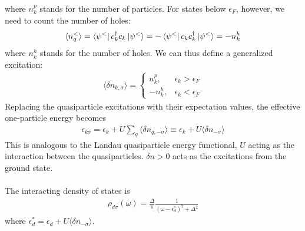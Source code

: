 where \(n^p_k\) stands for the number of particles.
For states below \(\epsilon_F\), however, we need to count the number of holes:
\begin{equation}\begin{aligned}
	\langle  n_q^<\rangle = \bra{\psi^<}c^\dagger_k c_k\ket{\psi^<} = -\bra{\psi^<}c_k c^\dagger_k \ket{\psi^<} = -n^h_k
\end{aligned}\end{equation}
where \(n^h_k\) stands for the number of holes.
We can thus define a generalized excitation:
\begin{equation}\begin{aligned}
	\langle \delta n_{k,\sigma}\rangle = \begin{cases} n^p_k, &\epsilon_k > \epsilon_F\\ -n^h_k, &\epsilon_k < \epsilon_F\end{cases}
\end{aligned}\end{equation}
Replacing the quasiparticle excitations with their expectation values, the effective one-particle energy becomes
\begin{equation}\begin{aligned}
	\epsilon_{k\sigma} = \epsilon_k + U\sum_q \langle \delta n_{q,-\sigma}\rangle \equiv \epsilon_k + U\langle \delta n_{-\sigma}\rangle
\end{aligned}\end{equation}
This is analogous to the Landau quasiparticle energy functional, \(U\) acting as the interaction between the quasiparticles.
\(\delta n > 0\) acts as the excitations from the ground state.
\\\\
The interacting density of states is
\begin{equation}\begin{aligned}
	\label{dosint}
	\rho_{d\sigma}(\omega) = \frac{\Delta}{\pi}\frac{1}{\left(\omega - \epsilon_d^*\right)^2 + \Delta^2}
\end{aligned}\end{equation}
where \(\epsilon_d^* = \epsilon_d + U\langle \delta n_{-\sigma}\rangle\).

